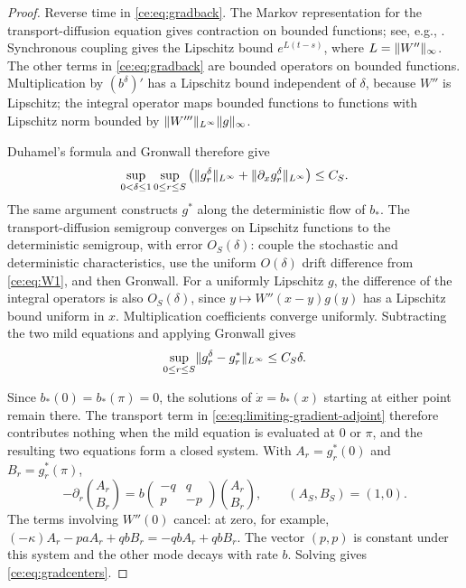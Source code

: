 \documentclass[11pt,reqno]{amsart}
\numberwithin{equation}{section}
\theoremstyle{plain}
\theoremstyle{remark}
\DeclarePairedDelimiter{\norm}{\lVert}{\rVert}
\begin{document}
\begin{proof}
Reverse time in \eqref{ce:eq:gradback}. The Markov representation for the transport-diffusion equation gives contraction on bounded functions; see, e.g., \cite[Sections~7.1 and~8.1]{Oksendal}. Synchronous coupling gives the Lipschitz bound $e^{L(t-s)}$, where $L=\norm{W''}_\infty$. The other terms in \eqref{ce:eq:gradback} are bounded operators on bounded functions. Multiplication by $(b^\delta)'$ has a Lipschitz bound independent of $\delta$, because $W''$ is Lipschitz; the integral operator maps bounded functions to functions with Lipschitz norm bounded by $\norm{W'''}_{L^\infty}\norm g_\infty$.

Duhamel's formula and Gronwall therefore give
\begin{equation}\label{ce:eq:adjoint-uniform-bound}
 \sup_{0<\delta\le1}\sup_{0\le r\le S}
 \left(\norm{g^\delta_r}_{L^\infty}+\norm{\partial_xg^\delta_r}_{L^\infty}\right)\le C_S.
\end{equation} The same argument constructs $g^*$ along the deterministic flow of $b_*$. The transport-diffusion semigroup converges on Lipschitz functions to the deterministic semigroup, with error $O_S(\delta)$: couple the stochastic and deterministic characteristics, use the uniform $O(\delta)$ drift difference from \eqref{ce:eq:W1}, and then Gronwall. For a uniformly Lipschitz $g$, the difference of the integral operators is also $O_S(\delta)$, since $y\mapsto W''(x-y)g(y)$ has a Lipschitz bound uniform in $x$. Multiplication coefficients converge uniformly. Subtracting the two mild equations and applying Gronwall gives
\begin{equation}\label{ce:eq:adjoint-convergence-bound}
 \sup_{0\le r\le S}\norm{g^\delta_r-g^*_r}_{L^\infty}\le C_S\delta.
\end{equation}

Since $b_*(0)=b_*(\pi)=0$, the solutions of $\dot x=b_*(x)$ starting at either point remain there. The transport term in \eqref{ce:eq:limiting-gradient-adjoint} therefore contributes nothing when the mild equation is evaluated at $0$ or $\pi$, and the resulting two equations form a closed system. With $A_r=g^*_r(0)$ and $B_r=g^*_r(\pi)$,
\begin{equation}\label{ce:eq:adjoint2}
 -\partial_r\binom{A_r}{B_r}
 =b\begin{pmatrix}-q&q\\p&-p\end{pmatrix}\binom{A_r}{B_r},
 \qquad (A_S,B_S)=(1,0).
\end{equation}
The terms involving $W''(0)$ cancel: at zero, for example,
$(-\kappa)A_r-paA_r+qbB_r=-qbA_r+qbB_r$.
The vector $(p,p)$ is constant under this system and the other mode decays with rate $b$. Solving gives \eqref{ce:eq:gradcenters}.
\end{proof}
\end{document}
